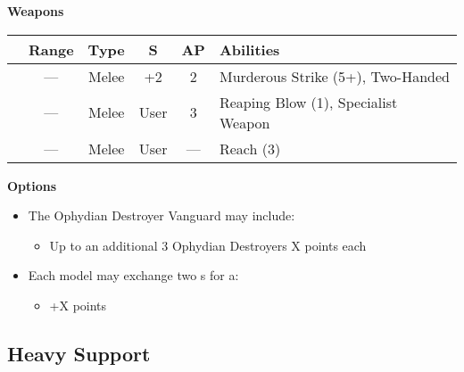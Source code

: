 \begin{minipage}[t]{0.72\textwidth}
	\vspace*{2em}
	\textbf{Weapons}
	
	\begin{tabular}{m{95 pt} *{4}{c} >{\raggedright\arraybackslash}p{130pt}}
		& Range & Type & S & AP & Abilities \\
		\hline
		\quickref{Hyperphase Reap-Blade} & — & Melee & +2 & 2 & Murderous Strike (5+), Two-Handed \\
		\quickref{Hyperphase Thresher} & — & Melee & User & 3 & Reaping Blow (1), Specialist Weapon \\
		\quickref{Whip Coils} & — & Melee & User & — & Reach (3) \\
	\end{tabular}
	
	\vspace*{2em}
	\textbf{Options}
	\begin{itemize}
		\item The Ophydian Destroyer Vanguard may include:
		\begin{itemize}
			\item Up to an additional 3 Ophydian Destroyers \dotfill X points each
		\end{itemize}
		\item Each model may exchange two s for a:
		\begin{itemize}
			\item {} \dotfill +X points
		\end{itemize}
	\end{itemize}
\end{minipage}



\newpage
\subsection{Heavy Support}

\newpage
\subsubsection[Lokhust Destroyer Clave]{}

